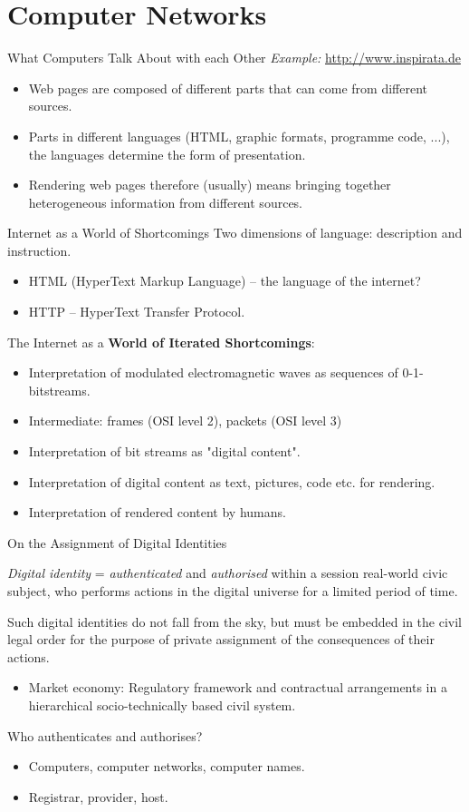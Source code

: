 \documentclass{beamer}
\begin{document}
\section{Computer Networks}
\begin{frame}{What Computers Talk About with each Other}
\emph{Example:} \url{http://www.inspirata.de} 
\begin{itemize}
\item Web pages are composed of different parts that can come from different
  sources.
\item Parts in different languages (HTML, graphic formats, programme code,
  ...), the languages determine the form of presentation.
\item Rendering web pages therefore (usually) means bringing together
  heterogeneous information from different sources.
\end{itemize}
\end{frame}
\begin{frame}{Internet as a World of Shortcomings}
Two dimensions of language: description and instruction.
\begin{itemize}
\item HTML (HyperText Markup Language) -- the language of the internet? 
\item HTTP -- HyperText Transfer Protocol.
\end{itemize}
The Internet as a \textbf{World of Iterated Shortcomings}: 
\begin{itemize}
\item Interpretation of modulated electromagnetic waves as sequences of
  0-1-bitstreams. 
\item Intermediate: frames (OSI level 2), packets (OSI level 3)
\item Interpretation of bit streams as "digital content".
\item Interpretation of digital content as text, pictures, code etc. for
  rendering. 
\item Interpretation of rendered content by humans.
\end{itemize}
\end{frame}
\begin{frame}{On the Assignment of Digital Identities}

\emph{Digital identity} = \emph{authenticated} and \emph{authorised} within a
session real-world civic subject, who performs actions in the digital universe
for a limited period of time.

Such digital identities do not fall from the sky, but must be embedded in the
civil legal order for the purpose of private assignment of the consequences of
their actions.
\begin{itemize}
\item Market economy: Regulatory framework and contractual arrangements in a
  hierarchical socio-technically based civil system.
\end{itemize}
Who authenticates and authorises? 
\begin{itemize}
\item Computers, computer networks, computer names.
\item Registrar, provider, host.
\end{itemize}
\end{frame}
\end{document}
